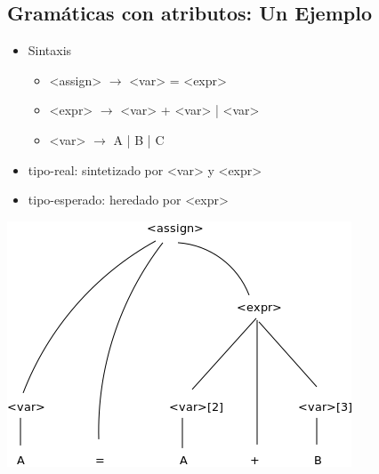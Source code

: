 \documentclass[11pt]{article}
\begin{document}
\subsection*{Gramáticas con atributos: Un Ejemplo}
\label{sec:org4316ad3}
\begin{itemize}
\item Sintaxis
\begin{itemize}
\item <assign> \(\to\) <var> = <expr>
\item <expr> \(\to\) <var> + <var> | <var>
\item <var> \(\to\) A | B | C
\end{itemize}

\item tipo-real: sintetizado por <var> y <expr>
\item tipo-esperado: heredado por <expr>
\end{itemize}

\begin{center}
\includegraphics[width=.9\linewidth]{attribgram1.png}
\end{center}
\end{document}
